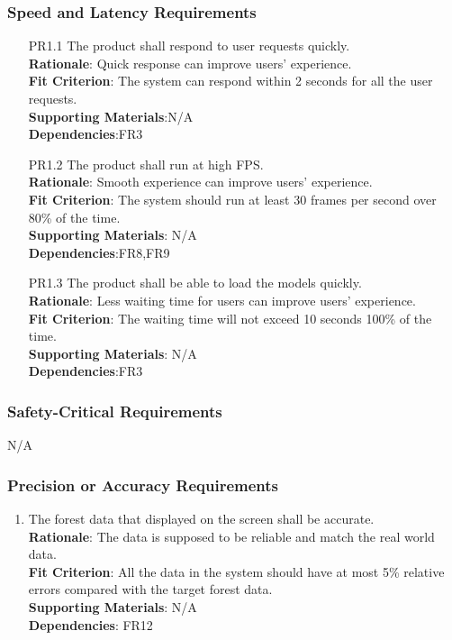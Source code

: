 \documentclass{article}
\begin{document}
\subsubsection{Speed and Latency Requirements}
\begin{enumerate}
    \item[PR1.1] The product shall respond to user requests quickly.\\
    \textbf{Rationale}: Quick response can improve users' experience.\\
    \textbf{Fit Criterion}: The system can respond within 2 seconds for all the user requests.\\
\textbf{Supporting Materials}:N/A\\
\textbf{Dependencies}:FR3\\
    
    \item[PR1.2] The product shall run at high FPS.\\
    \textbf{Rationale}: Smooth experience can improve users' experience.\\
    \textbf{Fit Criterion}: The system should run at least 30 frames per second over 80\% of the time.\\
\textbf{Supporting Materials}: N/A\\
\textbf{Dependencies}:FR8,FR9\\
    
    \item[PR1.3] The product shall be able to load the models quickly.\\
    \textbf{Rationale}: Less waiting time for users can improve users' experience.\\
    \textbf{Fit Criterion}: The waiting time will not exceed 10 seconds 100\% of the time.\\
\textbf{Supporting Materials}: N/A\\
\textbf{Dependencies}:FR3\\

\end{enumerate}
\subsubsection{Safety-Critical Requirements}
N/A
\subsubsection{Precision or Accuracy Requirements}
\begin{enumerate}[PR3.1]
    \item The forest data that displayed on the screen shall be accurate.\\
    \textbf{Rationale}: The data is supposed to be reliable and match the real world data.\\
    \textbf{Fit Criterion}: All the data in the system should have at most 5\% relative errors compared with the target
    forest data.\\
\textbf{Supporting Materials}: N/A\\
\textbf{Dependencies}: FR12\\
 

\end{enumerate}
\end{document}
